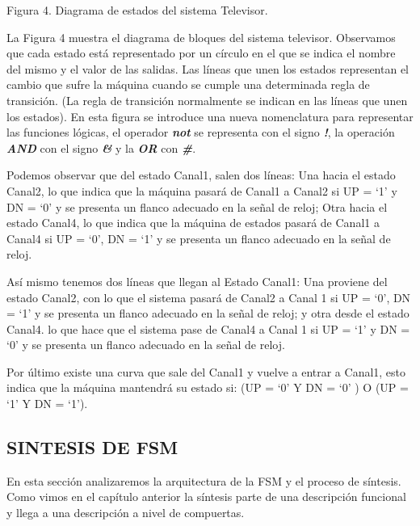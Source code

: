 {\centering Figura 4. Diagrama de estados del sistema Televisor. \par}

La Figura 4 muestra el diagrama de bloques del sistema televisor. Observamos que cada estado está representado por un círculo en el que se indica el nombre del mismo y el valor de las salidas. Las líneas que unen los estados representan el cambio que sufre la máquina cuando se cumple una determinada regla de transición. (La regla de transición normalmente se indican en las líneas que unen los estados). En esta figura se introduce una nueva nomenclatura para representar las funciones lógicas, el operador \textbf{\textit{not}} se representa con el signo \textbf{\textit{!}}, la operación \textbf{\textit{AND}} con el signo \textbf{\textit{\&}} y la \textbf{\textit{OR}} con \textbf{\textit{\#}}.

Podemos observar que del estado Canal1, salen dos líneas: Una hacia el estado Canal2, lo que indica que la máquina pasará de Canal1 a Canal2 si UP = {\textquoteleft}1{\textquoteright} y DN = {\textquoteleft}0{\textquoteright} y se presenta un flanco adecuado en
la señal de reloj; Otra hacia el estado Canal4, lo que indica que la máquina de estados pasará de Canal1 a Canal4 si UP = {\textquoteleft}0{\textquoteright},  DN = {\textquoteleft}1{\textquoteright} y se presenta un flanco adecuado en la señal de reloj.

Así mismo tenemos dos líneas que llegan al Estado Canal1: Una proviene del estado Canal2, con lo que el sistema pasará de Canal2 a Canal 1 si UP = {\textquoteleft}0{\textquoteright}, DN = {\textquoteleft}1{\textquoteright} y se presenta un flanco adecuado en la señal de reloj; y otra desde el estado Canal4. lo que hace que el sistema pase de Canal4 a Canal 1 si UP = {\textquoteleft}1{\textquoteright} y DN = {\textquoteleft}0{\textquoteright} y se presenta un flanco adecuado en la señal de reloj.

Por último existe una curva que sale del Canal1 y vuelve a entrar a Canal1, esto indica que la máquina mantendrá su estado si: (UP 
= {\textquoteleft}0{\textquoteright} Y DN = {\textquoteleft}0{\textquoteright} ) O (UP = {\textquoteleft}1{\textquoteright} Y DN = {\textquoteleft}1{\textquoteright}).

\subsection[SINTESIS DE FSM]{ SINTESIS DE FSM}

En esta sección analizaremos la arquitectura de la FSM y el proceso de síntesis. Como vimos en el capítulo anterior la síntesis parte de una descripción funcional y llega a una descripción a nivel de compuertas.

